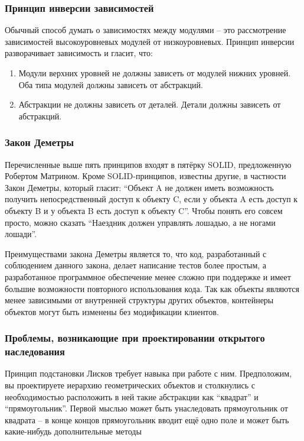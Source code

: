 \documentclass[a4paper,12pt,oneside]{article}
\begin{document}
\subsubsection{Принцип инверсии зависимостей}\label{DIP}

Обычный способ думать о зависимостях между модулями -- это рассмотрение зависимостей высокоуровневых модулей от низкоуровневых. Принцип инверсии разворачивает зависимость и гласит, что:

\begin{enumerate}
\item Модули верхних уровней не должны зависеть от модулей нижних уровней. Оба типа модулей должны зависеть от абстракций.
\item Абстракции не должны зависеть от деталей. Детали должны зависеть от абстракций.
\end{enumerate}

\subsubsection{Закон Деметры}\label{DemeterLaw}

Перечисленные выше пять принципов входят в пятёрку SOLID, предложенную Робертом Матрином. Кроме SOLID-принципов, известны другие, в частности Закон Деметры, который гласит: ``Объект A не должен иметь возможность получить непосредственный доступ к объекту C, если у объекта A есть доступ к объекту B и у объекта B есть доступ к объекту C''. Чтобы понять его совсем просто, можно сказать ``Наездник должен управлять лошадью, а не ногами лошади''.

Преимуществами закона Деметры является то, что код, разработанный с соблюдением данного закона, делает написание тестов более простым, а разработанное программное обеспечение менее сложно при поддержке и имеет большие возможности повторного использования кода. Так как объекты являются менее зависимыми от внутренней структуры других объектов, контейнеры объектов могут быть изменены без модификации клиентов.

\subsubsection{Проблемы, возникающие при проектировании открытого наследования}\label{InhProblems}

Принцип подстановки Лисков требует навыка при работе с ним. Предположим, вы проектируете иерархию геометрических объектов и столкнулись с необходимостью расположить в ней такие абстракции как ``квадрат'' и ``прямоугольник''. Первой мыслью может быть унаследовать прямоугольник от квадрата – в конце концов прямоугольник вводит ещё одно поле и может быть какие-нибудь дополнительные методы
\end{document}
